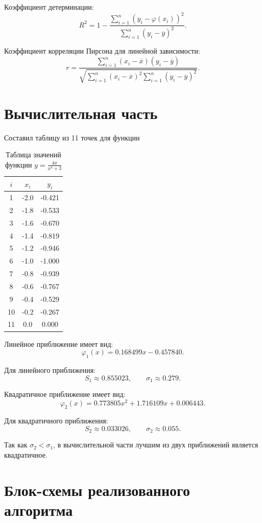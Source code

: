 \documentclass[a4paper,14pt]{extarticle}
\begin{document}
Коэффициент детерминации:
\[
    R^2 = 1 - \frac{\sum_{i=1}^{n}(y_i - \varphi(x_i))^2}{\sum_{i=1}^{n}(y_i - \overline{y})^2}.
\]

Коэффициент корреляции Пирсона для линейной зависимости:
\[
    r = \frac{\sum_{i=1}^{n}(x_i - \overline{x})(y_i - \overline{y})}
    {\sqrt{\sum_{i=1}^{n}(x_i - \overline{x})^2 \sum_{i=1}^{n}(y_i - \overline{y})^2}}.
\]

\section{Вычислительная часть}

Составил таблицу из 11 точек для функции

\begin{table}[H]
\centering
\caption{Таблица значений функции $y = \frac{4x}{x^4 + 3}$}
\begin{tabular}{c|c|c}
\toprule
$i$ & $x_i$ & $y_i$ \\
\midrule
1 & -2.0 & -0.421 \\
2 & -1.8 & -0.533 \\
3 & -1.6 & -0.670 \\
4 & -1.4 & -0.819 \\
5 & -1.2 & -0.946 \\
6 & -1.0 & -1.000 \\
7 & -0.8 & -0.939 \\
8 & -0.6 & -0.767 \\
9 & -0.4 & -0.529 \\
10 & -0.2 & -0.267 \\
11 & 0.0 & 0.000 \\
\bottomrule
\end{tabular}
\end{table}

Линейное приближение имеет вид:
\[
    \varphi_1(x) = 0.168499x - 0.457840.
\]

Для линейного приближения:
\[
    S_1 \approx 0.855023, \qquad \sigma_1 \approx 0.279.
\]

Квадратичное приближение имеет вид:
\[
    \varphi_2(x) = 0.773805x^2 + 1.716109x + 0.006443.
\]

Для квадратичного приближения:
\[
    S_2 \approx 0.033026, \qquad \sigma_2 \approx 0.055.
\]

Так как $\sigma_2 < \sigma_1$, в вычислительной части лучшим из двух приближений является квадратичное.

\section{Блок-схемы реализованного алгоритма}
\end{document}
